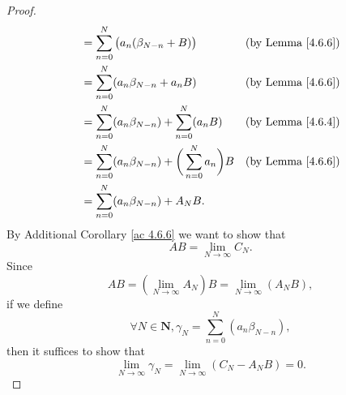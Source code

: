 \begin{proof}
\begin{align*}
                                      & = \sum_{n = 0}^N \big(a_n (\beta_{N - n} + B)\big)                      & \text{(by Lemma \ref{4.6.6})} \\
                                      & = \sum_{n = 0}^N (a_n \beta_{N - n} + a_n B)                            & \text{(by Lemma \ref{4.6.6})} \\
                                      & = \sum_{n = 0}^N (a_n \beta_{N - n}) + \sum_{n = 0}^N (a_n B)           & \text{(by Lemma \ref{4.6.4})} \\
                                      & = \sum_{n = 0}^N (a_n \beta_{N - n}) + \bigg(\sum_{n = 0}^N a_n\bigg) B & \text{(by Lemma \ref{4.6.6})} \\
                                      & = \sum_{n = 0}^N (a_n \beta_{N - n}) + A_N B.
    \end{align*}
    By Additional Corollary \ref{ac 4.6.6} we want to show that
    \[
        AB = \lim_{N \to \infty} C_N.
    \]
    Since
    \[
        AB = (\lim_{N \to \infty} A_N) B = \lim_{N \to \infty} (A_N B),
    \]
    if we define
    \[
        \forall N \in \mathbf{N}, \gamma_N = \sum_{n = 0}^N (a_n \beta_{N - n}),
    \]
    then it suffices to show that
    \[
        \lim_{N \to \infty} \gamma_N = \lim_{N \to \infty} (C_N - A_N B) = 0.
    \]


\end{proof}
